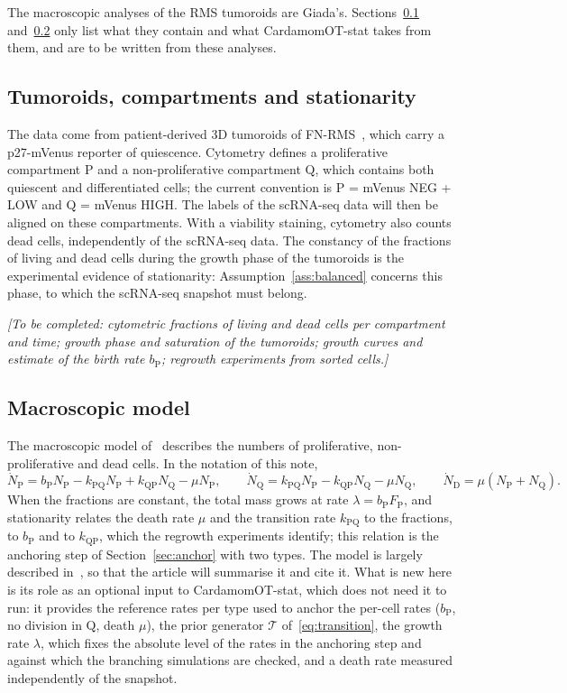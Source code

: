 \documentclass[a4paper, 11pt]{article}
\newcommand{\Tg}{\mathcal{T}}
\newcommand{\cP}{\mathrm{P}}
\newcommand{\cQ}{\mathrm{Q}}
\newcommand{\cD}{\mathrm{D}}
\newcommand{\tofill}[1]{\par\smallskip\noindent\emph{[To be completed: #1]}\par\smallskip}
\theoremstyle{plain}
\theoremstyle{remark}
\begin{document}
The macroscopic analyses of the RMS tumoroids are Giada's. Sections~\ref{sec:rms} and~\ref{sec:macro} only list what they contain and what CardamomOT-stat takes from them, and are to be written from these analyses.

\subsection{Tumoroids, compartments and stationarity}\label{sec:rms}

The data come from patient-derived 3D tumoroids of FN-RMS~\cite{savary2023fnrms}, which carry a p27-mVenus reporter of quiescence. Cytometry defines a proliferative compartment $\cP$ and a non-proliferative compartment $\cQ$, which contains both quiescent and differentiated cells; the current convention is $\cP$ = mVenus NEG + LOW and $\cQ$ = mVenus HIGH. The labels of the scRNA-seq data will then be aligned on these compartments. With a viability staining, cytometry also counts dead cells, independently of the scRNA-seq data. The constancy of the fractions of living and dead cells during the growth phase of the tumoroids is the experimental evidence of stationarity: Assumption~\ref{ass:balanced} concerns this phase, to which the scRNA-seq snapshot must belong.

\tofill{cytometric fractions of living and dead cells per compartment and time; growth phase and saturation of the tumoroids; growth curves and estimate of the birth rate $b_\cP$; regrowth experiments from sorted cells.}

\subsection{Macroscopic model}\label{sec:macro}

The macroscopic model of~\cite{rmsbio} describes the numbers of proliferative, non-proliferative and dead cells. In the notation of this note,
\begin{equation}\label{eq:macro}
\dot N_\cP = b_\cP N_\cP - k_{\cP\cQ}N_\cP + k_{\cQ\cP}N_\cQ - \mu N_\cP, \qquad
\dot N_\cQ = k_{\cP\cQ}N_\cP - k_{\cQ\cP}N_\cQ - \mu N_\cQ, \qquad
\dot N_\cD = \mu(N_\cP + N_\cQ).
\end{equation}
When the fractions are constant, the total mass grows at rate $\lambda = b_\cP F_\cP$, and stationarity relates the death rate $\mu$ and the transition rate $k_{\cP\cQ}$ to the fractions, to $b_\cP$ and to $k_{\cQ\cP}$, which the regrowth experiments identify; this relation is the anchoring step of Section~\ref{sec:anchor} with two types. The model is largely described in~\cite{rmsbio}, so that the article will summarise it and cite it. What is new here is its role as an optional input to CardamomOT-stat, which does not need it to run: it provides the reference rates per type used to anchor the per-cell rates ($b_\cP$, no division in $\cQ$, death $\mu$), the prior generator $\Tg$ of~\eqref{eq:transition}, the growth rate $\lambda$, which fixes the absolute level of the rates in the anchoring step and against which the branching simulations are checked, and a death rate measured independently of the snapshot.
\end{document}

